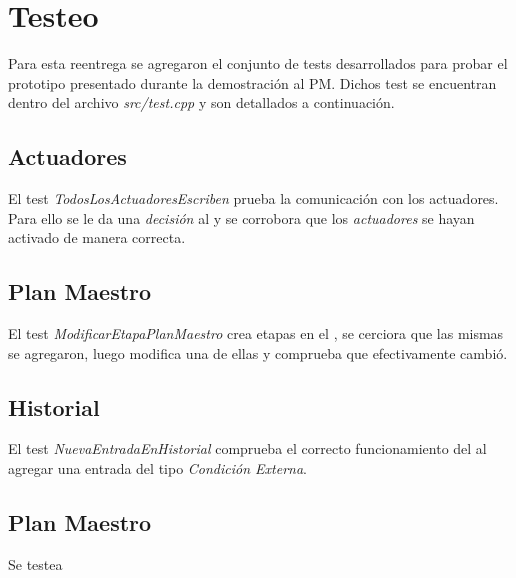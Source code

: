 \section{Testeo}

  Para esta reentrega se agregaron el conjunto de tests desarrollados para
  probar el prototipo presentado durante la demostraci\'on al PM. Dichos test
  se encuentran dentro del archivo \textit{src/test.cpp} y son detallados a 
  continuaci\'on. 

  \subsection{Actuadores}
    El test \textit{TodosLosActuadoresEscriben} prueba la comunicaci\'on con
    los actuadores. Para ello se le da una \textit{decisi\'on} al 
    \manejadorAct{} y se corrobora que los \textit{actuadores} se hayan
    activado de manera correcta.
  
  \subsection{Plan Maestro}
    El test \textit{ModificarEtapaPlanMaestro} crea etapas en el \planmaestro{}
    , se cerciora que las mismas se agregaron, luego modifica una de ellas y 
    comprueba que efectivamente cambi\'o.  

  \subsection{Historial}
    El test \textit{NuevaEntradaEnHistorial} comprueba el correcto
    funcionamiento del \historial{} al agregar una entrada del tipo 
    \textit{Condici\'on Externa}.  

  \subsection{Plan Maestro}
    Se testea 	
